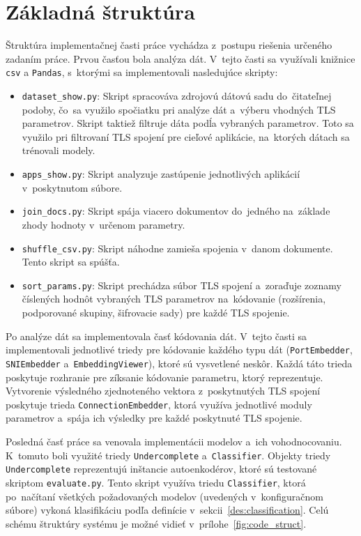\section{Základná štruktúra}
Štruktúra implementačnej časti práce vychádza z~postupu riešenia určeného zadaním práce. Prvou časťou bola analýza dát. V~tejto časti sa využívali knižnice \texttt{csv} a \texttt{Pandas}, s~ktorými sa implementovali nasledujúce skripty:
\begin{itemize}
    \item \texttt{dataset\_show.py}: Skript spracováva zdrojovú dátovú sadu do~čitateľnej podoby, čo~sa využilo spočiatku pri analýze dát a~výberu vhodných TLS parametrov. Skript taktiež filtruje dáta podĺa vybraných parametrov. Toto sa využilo pri filtrovaní TLS spojení pre cieľové aplikácie, na~ktorých dátach sa trénovali modely.
    \item \texttt{apps\_show.py}: Skript analyzuje zastúpenie jednotlivých aplikácií v~poskytnutom súbore.
    \item \texttt{join\_docs.py}: Skript spája viacero dokumentov do~jedného na~základe zhody hodnoty v~určenom parametry.
    \item \texttt{shuffle\_csv.py}: Skript náhodne zamieša spojenia v~danom dokumente. Tento skript sa spúšťa.
    \item \texttt{sort\_params.py}: Skript prechádza súbor TLS spojení a~zoraďuje zoznamy číslených hodnôt vybraných TLS parametrov na~kódovanie (rozšírenia, podporované skupiny, šifrovacie sady) pre každé TLS spojenie.
\end{itemize}

Po analýze dát sa implementovala časť kódovania dát. V~tejto časti sa implementovali jednotlivé triedy pre kódovanie každého typu dát (\texttt{PortEmbedder}, \texttt{SNIEmbedder} a~\texttt{EmbeddingViewer}), ktoré sú vysvetlené neskôr. Každá táto trieda poskytuje rozhranie pre zíksanie kódovanie parametru, ktorý reprezentuje. Vytvorenie výsledného zjednoteného vektora z~poskytnutých TLS spojení poskytuje trieda \texttt{ConnectionEmbedder}, ktorá využíva jednotlivé moduly parametrov a~spája ich výsledky pre každé poskytnuté TLS spojenie.

Posledná časť práce sa venovala implementácii modelov a~ich vohodnocovaniu. K~tomuto boli využité triedy \texttt{Undercomplete} a~\texttt{Classifier}. Objekty triedy \texttt{Undercomplete} reprezentujú inštancie autoenkodérov, ktoré sú testované skriptom \texttt{evaluate.py}. Tento skript využíva triedu \texttt{Classifier}, ktorá po~načítaní všetkých požadovaných modelov (uvedených v~konfiguračnom súbore) vykoná klasifikáciu podľa definície v~sekcii~\ref{des:classification}. Celú schému štruktúry systému je možné vidieť v~prílohe~\ref{fig:code_struct}.

